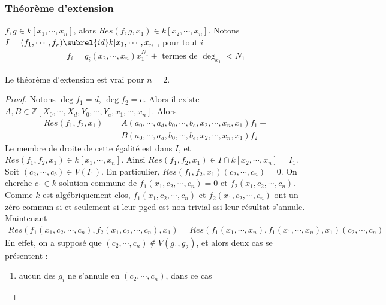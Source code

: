             \subsubsection{Théorème d'extension}
                $f,g \in k[x_1, \cdots, x_n]$, alors $Res(f,g,x_1) \in k[x_2, \cdots, x_n]$. Notons $I = (f_1, \cdots, f_r) \subrel{id} k[x_1, \cdots, x_n]$, pour tout $i$
                \begin{align*}
                    f_i = g_i(x_2, \cdots, x_n) x_1^{N_1} + \text{ termes de } \deg_{x_1} < N_1
                \end{align*}
                \begin{lemm}
                    \label{lemm161}
                    Le théorème d'extension est vrai pour $n = 2$.
                \end{lemm}
                \begin{proof}
                    Notons $\deg f_1 = d$, $\deg f_2 = e$. Alors il existe $A,B \in \mathbb{Z}[X_0, \cdots, X_d, Y_0, \cdots, Y_e, x_1, \cdots, x_n]$. Alors
                    \begin{align*}
                        Res(f_1, f_2, x_1) = &A(a_0, \cdots, a_d, b_0, \cdots, b_e, x_2, \cdots, x_n, x_1) f_1 + \\
                        &B(a_0, \cdots, a_d, b_0, \cdots, b_e, x_2, \cdots, x_n, x_1) f_2
                    \end{align*}
                    Le membre de droite de cette égalité est dans $I$, et $Res(f_1, f_2, x_1) \in k[x_1, \cdots, x_n]$. Ainsi $Res(f_1, f_2, x_1) \in I \cap k[x_2, \cdots, x_n] = I_1$. Soit $(c_2, \cdots, c_b) \in V(I_1)$. En particulier, $Res(f_1, f_2, x_1)(c_2, \cdots, c_n) = 0$. On cherche $c_1 \in k$ solution commune de $f_1(x_1, c_2, \cdots, c_n) = 0$ et $f_2(x_1, c_2, \cdots, c_n)$. Comme $k$ est algébriquement clos, $f_1(x_1, c_2, \cdots, c_n)$ et $f_2(x_1, c_2, \cdots, c_n)$ ont un zéro commun si et seulement si leur pgcd est non trivial ssi leur résultat s'annule. Maintenant 
                    \begin{align*}
                        Res(f_1(x_1, c_2, \cdots, c_n), f_2(x_1, c_2, \cdots, c_n), x_1) = Res(f_1(x_1, \cdots, x_n), f_1(x_1, \cdots, x_n), x_1)(c_2, \cdots, c_n)
                    \end{align*}
                    En effet, on a supposé que $(c_2, \cdots, c_n) \notin V(g_1, g_2)$, et alors deux cas se présentent : 
                    \begin{enumerate}
                        \item aucun des $g_i$ ne s'annule en $(c_2, \cdots, c_n)$, dans ce cas

\end{enumerate}
\end{proof}
